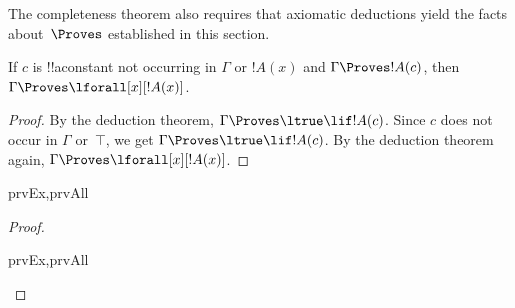 \documentclass[../../../include/open-logic-section]{subfiles}
\begin{document}

\begin{explain}
  The completeness theorem also requires that axiomatic deductions
  yield the facts about~$\Proves$ established in this section.
\end{explain}

\begin{thm}
 If $c$ is !!a{constant} not occurring
in $\Gamma$ or $!A(x)$ and $\Gamma \Proves !A(c)$, then $\Gamma
\Proves \lforall[x][!A(x)]$.
\end{thm}

\begin{proof}
By the deduction theorem, $\Gamma \Proves \ltrue \lif !A(c)$. Since
$c$ does not occur in $\Gamma$ or~$\top$, we get $\Gamma \Proves
\ltrue \lif !A(c)$. By the deduction theorem again, $\Gamma \Proves
\lforall[x][!A(x)]$.
\end{proof}

\begin{prop}
\begin{tagenumerate}{prvEx,prvAll}

\end{tagenumerate}
\end{prop}

\begin{proof}
\begin{tagenumerate}{prvEx,prvAll}
\end{tagenumerate}
\end{proof}
\end{document}
